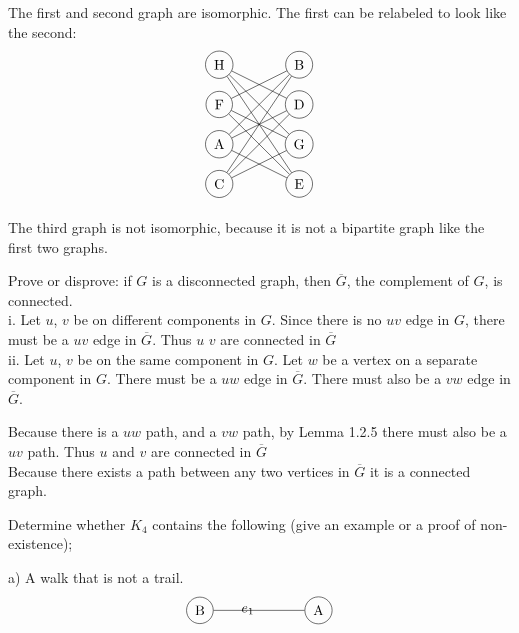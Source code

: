 \documentclass[12pt]{article}
\newenvironment{question}[2][Question]{\begin{trivlist}
\item[\hskip \labelsep {\bfseries #1}\hskip \labelsep {\bfseries #2.}]}{\end{trivlist}}
\begin{document}
	The first and second graph are isomorphic. The first can be relabeled to look like the second:
		\begin{align*}
	\begin{tikzpicture}
	\node[shape=circle,draw=black] (C) at (0,0) {C};
	\node[shape=circle,draw=black] (A) at (0,1) {A};
	\node[shape=circle,draw=black] (F) at (0,2) {F};
	\node[shape=circle,draw=black] (H) at (0,3) {H};
	\node[shape=circle,draw=black] (E) at (2,0) {E};
	\node[shape=circle,draw=black] (G) at (2,1) {G};
	\node[shape=circle,draw=black] (D) at (2,2) {D};
	\node[shape=circle,draw=black] (B) at (2,3) {B};
	\path [] (D) edge node[left] {} (A);
	\path [] (A) edge node[left] {} (B);
	\path [] (B) edge node[left] {} (C);
	\path [] (C) edge node[left] {} (D);
	\path [] (E) edge node[left] {} (F);
	\path [] (F) edge node[left] {} (G);
	\path [] (G) edge node[left] {} (H);
	\path [] (H) edge node[left] {} (E);
	\path [] (A) edge node[left] {} (E);
	\path [] (B) edge node[left] {} (F);
	\path [] (G) edge node[left] {} (C);
	\path [] (D) edge node[left] {} (H);
	\end{tikzpicture}
	\end{align*}
	
	The third graph is not isomorphic, because it is not a bipartite graph like the first two graphs.	
	
\begin{question}{5}
	Prove or disprove: if $G$ is a disconnected graph, then $\overline{G}$, the complement of $G$, is connected.\\	
	
	i. Let $u$, $v$ be on different components in $G$. Since there is no $uv$ edge in $G$, there must be a $uv$ edge in $\overline{G}$. Thus $u$ $v$ are connected in $\overline{G}$\\
		
	ii. Let $u$, $v$ be on the same component in $G$. Let $w$ be a vertex on a separate component in $G$. There must be a $uw$ edge in $\overline{G}$. There must also be a $vw$ edge in $\overline{G}$. 

	Because there is a $uw$ path, and a $vw$ path, by Lemma 1.2.5 there must also be a $uv$ path. Thus $u$ and $v$ are connected in $\overline{G}$\\

	Because there exists a path between any two vertices in $\overline{G}$ it is a connected graph.
\end{question}

\begin{question}{6}
Determine whether $K_4$ contains the following (give an example or a proof of non-existence);
\end{question}
a) A walk that is not a trail. \\
\begin{align*}
\begin{tikzpicture}
    \node[shape=circle,draw=black] (A) at (3,0) {A};
    \node[shape=circle,draw=black] (B) at (0,0) {B};
    \path [] (A) edge node[left] {$e_1$} (B);
\end{tikzpicture}
\end{align*}
\end{document}
